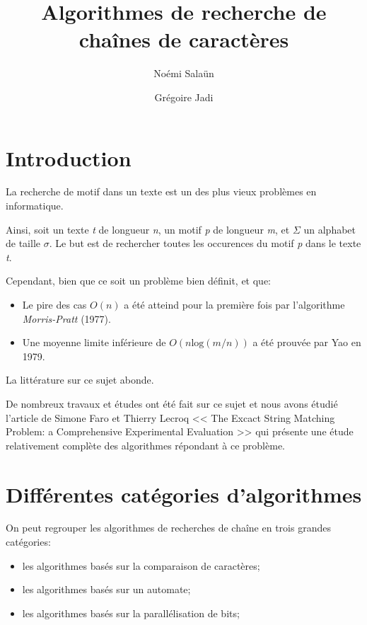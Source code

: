 \documentclass[a4paper,11pt]{article}
\begin{document}
\title{Algorithmes de recherche de chaînes de caractères}
\author{Noémi Salaün \and{} Grégoire Jadi}
\date{}

\maketitle
\tableofcontents

\section{Introduction}

La recherche de motif dans un texte est un des plus vieux problèmes en informatique.

Ainsi, soit un texte \emph{t} de longueur \emph{n}, un motif \emph{p} de longueur \emph{m}, et $ \Sigma $ un alphabet de taille $ \sigma $. Le but est de rechercher toutes les occurences du motif \emph{p} dans le texte \emph{t}.

Cependant, bien que ce soit un problème bien définit, et que:

\begin{itemize}
\item Le pire des cas $ O(n) $ a été atteind pour la première fois par l'algorithme \emph{Morris-Pratt} (1977).
\item Une moyenne limite inférieure de $ O(n\text{log}(m / n)) $ a été prouvée par Yao en 1979.
\end{itemize}

La littérature sur ce sujet abonde.

De nombreux travaux et études ont été fait sur ce sujet et nous avons étudié l'article de Simone Faro et Thierry Lecroq << The Excact String Matching Problem: a Comprehensive Experimental Evaluation >>\cite{DBLP:journals/corr/abs-1012-2547} qui présente une étude relativement complète des algorithmes répondant à ce problème.

\section{Différentes catégories d'algorithmes}

On peut regrouper les algorithmes de recherches de chaîne en trois grandes catégories:

\begin{itemize}
\item les algorithmes basés sur la comparaison de caractères;
\item les algorithmes basés sur un automate;
\item les algorithmes basés sur la parallélisation de bits;
\end{itemize}
\end{document}
